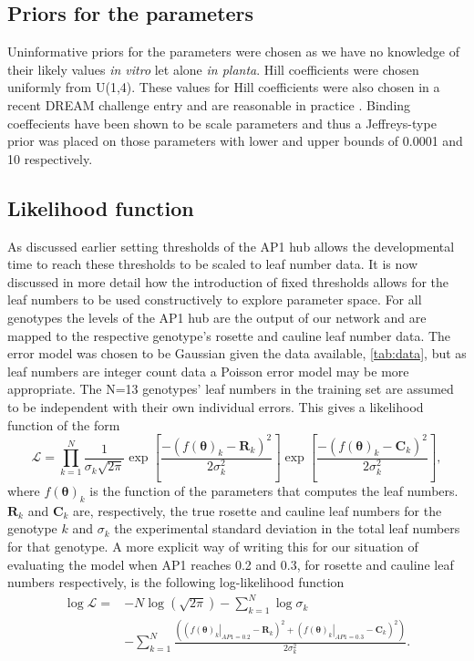 \subsection{Priors for the parameters}

Uninformative priors for the parameters were chosen as we have no knowledge of their likely values \emph{in vitro} let alone \emph{in planta}.
Hill coefficients were chosen uniformly from U(1,4).
These values for Hill coefficients were also chosen in a recent DREAM challenge entry \cite{steiert2012} and are reasonable in practice \cite{sneppen2008}.
Binding coeffecients have been shown to be scale parameters \cite{grandison2008} and thus a Jeffreys-type prior was placed on those parameters with lower and upper bounds of 0.0001 and 10 respectively.

\subsection{Likelihood function}

As discussed earlier setting thresholds of the AP1 hub allows the developmental time to reach these thresholds to be scaled to leaf number data.
It is now discussed in more detail how the introduction of fixed thresholds allows for the leaf numbers to be used constructively to explore parameter space.
For all genotypes the levels of the AP1 hub are the output of our network and are mapped to the respective genotype's rosette and cauline leaf number data.
The error model was chosen to be Gaussian given the data available, \autoref{tab:data}, but as leaf numbers are integer count data a Poisson error model may be more appropriate.
The N=13 genotypes' leaf numbers in the training set are assumed to be independent with their own individual errors.
This gives a likelihood function of the form
\begin{equation*}
\mathcal L = \prod_{k=1}^N\frac{1}{\sigma_k \sqrt{2\pi}}\exp\left[\frac{-\left(f\left(\mathbf{\theta}\right)_k - \mathbf{R}_k\right)^2}{2\sigma_k^2}\right]\exp\left[\frac{-\left(f\left(\mathbf{\theta}\right)_k - \mathbf{C}_k\right)^2}{2\sigma_k^2}\right],
\end{equation*}
where $f\left(\mathbf{\theta}\right)_k$ is the function of the parameters that computes the leaf numbers. $\mathbf{R}_k$ and $\mathbf{C}_k$ are, respectively, the true rosette and cauline leaf numbers for the genotype $k$ and $\sigma_k$ the experimental standard deviation in the total leaf numbers for that genotype.
A more explicit way of writing this for our situation of evaluating the model when AP1 reaches 0.2 and 0.3, for rosette and cauline leaf numbers respectively, is the following log-likelihood function
\begin{align*}
\log\mathcal L = &-N\log\left(\sqrt{2\pi}\right) - \sum_{k=1}^N\log\sigma_k\nonumber\\ &- \sum_{k=1}^N\frac{\left(\left(\left.f\left(\mathbf{\theta}\right)_k\right|_{AP1=0.2} - \mathbf{R}_k\right)^2 + \left(\left.f\left(\mathbf{\theta}\right)_k\right|_{AP1=0.3} - \mathbf{C}_k\right)^2\right)}{2\sigma_k^2}.
\end{align*}

